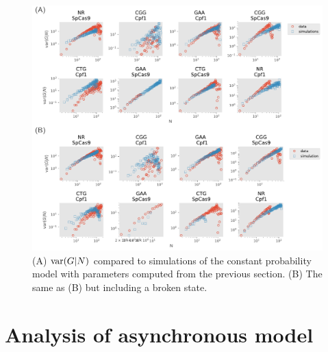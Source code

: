 \documentclass{article}
\begin{document}
\begin{figure}[h!]
\centering
\includegraphics[scale=0.7]{fig3.pdf}
\caption{(A) ${\rm var}(G|N)$ compared to simulations of the constant probability model with parameters computed from the previous section.   (B) The same as (B) but including a broken state. }\label{fig:3}
\end{figure}



\newpage

\appendix

\renewcommand{\theequation}{S.\arabic{equation}}
\section{Analysis of asynchronous model}\label{app:async}
\end{document}
